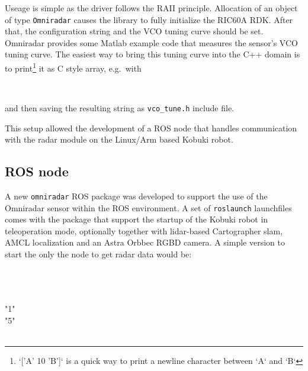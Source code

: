 Useage is simple as the driver follows the RAII principle. Allocation of
an object of type \texttt{Omniradar} causes the library to fully
initialize the RIC60A RDK. After that, the configuration string and the
VCO tuning curve should be set. Omniradar provides some Matlab example
code that measures the sensor's VCO tuning curve. The easiest way to
bring this tuning curve into the C++ domain is to
print\footnote{`['A' 10 'B']` is a quick way to print a newline character between `A` and `B`}
it as C style array, e.g.~with

\begin{Shaded}
\begin{Highlighting}[]
\NormalTok{[ }    \\
\NormalTok{    }\NormalTok{ ]}
\end{Highlighting}
\end{Shaded}

and then saving the resulting string as \texttt{vco\_tune.h} include
file.

This setup allowed the development of a ROS node that handles
communication with the radar module on the Linux/Arm based Kobuki robot.

\subsection{ROS node}\label{ros-node}

A new \texttt{omniradar} ROS package was developed to support the use of
the Omniradar sensor within the ROS environment. A set of
\texttt{roslaunch} launchfiles comes with the package that support the
startup of the Kobuki robot in teleoperation mode, optionally together
with lidar-based Cartographer slam, AMCL localization and an Astra
Orbbec RGBD camera. A simple version to start the only the node to get
radar data would be:

\begin{Shaded}
\begin{Highlighting}[]
\\
    \\
\NormalTok{    }\NormalTok{>}\\
 "1"\NormalTok{ />}\\
  "5"\NormalTok{ />}\\
\\
\end{Highlighting}
\end{Shaded}

